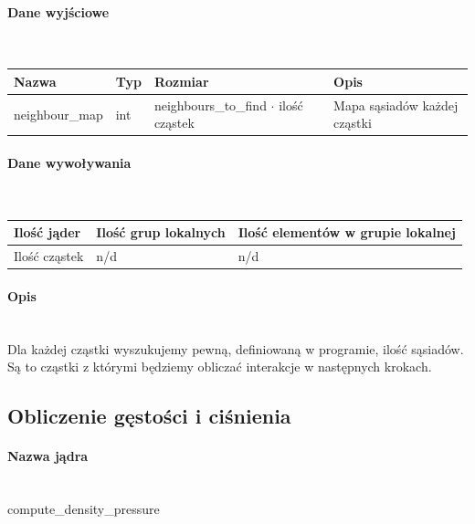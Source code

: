 \documentclass[polish, 12pt]{aghthesis}
\begin{document}
				\paragraph{Dane wyjściowe} \ \\
					\begin{tabular}{| p{} | p{} | p{} | p{} |}
					\hline
						Nazwa & Typ & Rozmiar & Opis \\
					\hline
						neighbour\_map & int & neighbours\_to\_find ${\cdot}$ ilość cząstek & Mapa sąsiadów każdej cząstki\\
					\hline
				\end{tabular}
				\paragraph{Dane wywoływania} \ \\
					\begin{tabular}{| p{} | p{} | p{}|}
					\hline
						Ilość jąder & Ilość grup lokalnych & Ilość elementów w grupie lokalnej \\
					\hline
						Ilość cząstek & n/d & n/d \\ 
					\hline
					\end{tabular}
				\paragraph{Opis} \ \\
					\indent Dla każdej cząstki wyszukujemy pewną, definiowaną w programie, ilość sąsiadów. Są to cząstki z którymi będziemy obliczać interakcje w następnych krokach.
 
		\subsection{Obliczenie gęstości i ciśnienia}
				\paragraph{Nazwa jądra} \ \\
					compute\_density\_pressure
\end{document}
